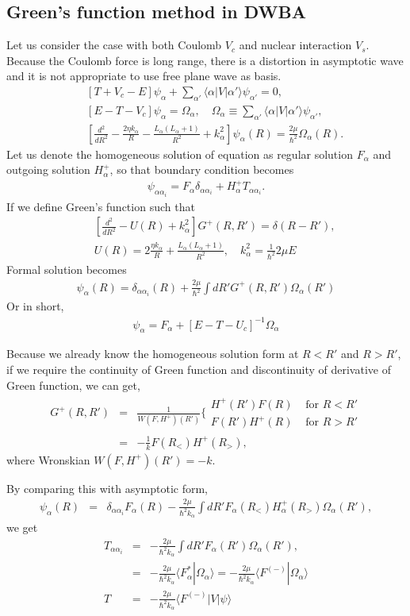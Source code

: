 \documentclass[10pt]{article}
\newcommand{\bea}{\begin{eqnarray}}
\newcommand{\eea}{\end{eqnarray}}
\newcommand{\no}{\nonumber \\}
\def\la{\langle}
\def\ra{\rangle}
\begin{document}
\subsection{Green's function method in DWBA}
Let us consider the case with both Coulomb $V_c$ and nuclear interaction $V_s$.
Because the Coulomb force is long range, there is a distortion in asymptotic wave
and it is not appropriate to use free plane wave as basis. 
\bea 
& &[T+V_c-E]\psi_\alpha+\sum_{\alpha'}\la \alpha|V|\alpha'\ra \psi_{\alpha'}=0,\no 
& &[E-T-V_c]\psi_\alpha=\Omega_\alpha,
 \quad \Omega_\alpha\equiv \sum_{\alpha'}\la \alpha|V|\alpha'\ra \psi_{\alpha'},\no 
& &[\frac{d^2}{dR^2}-\frac{2\eta k_\alpha}{R}-\frac{L_\alpha(L_\alpha+1)}{R^2}
 +k_\alpha^2]\psi_\alpha(R)=\frac{2\mu}{\hbar^2}\Omega_\alpha(R). 
\eea
Let us denote the homogeneous solution of equation as 
regular solution $F_\alpha$ and outgoing solution $H^{+}_\alpha$, 
so that boundary condition becomes
\bea 
\psi_{\alpha\alpha_i}=F_\alpha \delta_{\alpha\alpha_i}+H^{+}_\alpha T_{\alpha\alpha_i}.
\eea 
If we define Green's function such that
\bea 
& &[\frac{d^2}{dR^2}-U(R)+k_\alpha^2]G^+(R,R')=\delta(R-R'),\no 
& & U(R)=2\frac{\eta k_\alpha}{R}+\frac{L_\alpha(L_\alpha+1)}{R^2}, \quad 
k_\alpha^2=\frac{1}{\hbar^2}2\mu E
\eea 
Formal solution becomes
\bea 
\psi_\alpha(R)=\delta_{\alpha\alpha_i}(R)+
            \frac{2\mu}{\hbar^2}\int dR' G^+(R,R')\Omega_\alpha(R')
\eea 
Or in short,
\bea 
\psi_\alpha=F_\alpha+[E-T-U_c]^{-1}\Omega_\alpha 
\eea 

Because we already know the homogeneous solution form at $R<R'$ and $R>R'$,
if we require the continuity of Green function
and discontinuity of derivative of Green function,
we can get,
\bea 
G^+(R,R')&=&\frac{1}{W(F,H^+)(R')}\Big\{ \begin{array}{ll} H^+(R')F(R) & \mbox{ for } R<R' \\
                                                         F(R')H^+(R) & \mbox{ for } R>R'
             \end{array} \no 
         &=&-\frac{1}{k}F(R_{<})H^+(R_{>}),    
\eea 
where Wronskian $W(F,H^+)(R')=-k$.

By comparing this with asymptotic form, 
\bea 
\psi_\alpha(R)&=&\delta_{\alpha\alpha_i}F_\alpha(R)
              -\frac{2\mu}{\hbar^2 k_\alpha}\int d R'
              F_{\alpha}(R_<) H^+_\alpha(R_>)\Omega_\alpha(R'),
\eea 
we get
\bea 
T_{\alpha\alpha_i}&=&-\frac{2\mu}{\hbar^2 k_\alpha}\int d R' F_\alpha(R')\Omega_\alpha(R'),\no 
                  &=&-\frac{2\mu}{\hbar^2 k_\alpha}\la F^*_\alpha|\Omega_\alpha\ra 
                  =-\frac{2\mu}{\hbar^2 k_\alpha}\la F^{(-)}|\Omega_\alpha\ra\no 
 T&=&-\frac{2\mu}{\hbar^2 k_\alpha}\la F^{(-)}|V|\psi\ra  
\eea 
\end{document}
